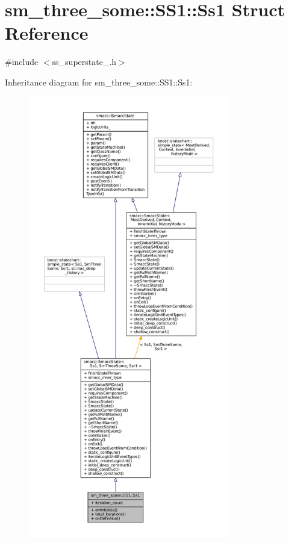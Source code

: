 \hypertarget{structsm__three__some_1_1SS1_1_1Ss1}{}\section{sm\+\_\+three\+\_\+some\+:\+:S\+S1\+:\+:Ss1 Struct Reference}
\label{structsm__three__some_1_1SS1_1_1Ss1}


{\ttfamily \#include $<$ss\+\_\+superstate\+\_.\+h$>$}



Inheritance diagram for sm\+\_\+three\+\_\+some\+:\+:S\+S1\+:\+:Ss1\+:
\nopagebreak
\begin{figure}[H]
\begin{center}
\leavevmode
\includegraphics[height=550pt]{structsm__three__some_1_1SS1_1_1Ss1__inherit__graph}
\end{center}
\end{figure}


